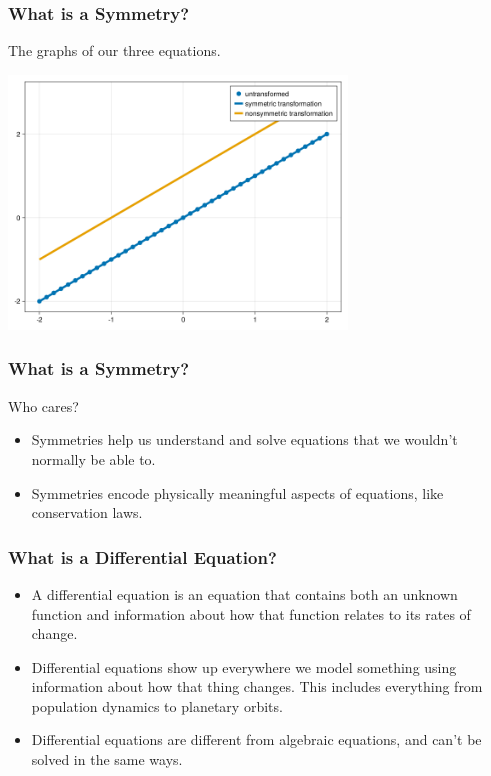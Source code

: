 \documentclass{beamer}
\begin{document}
\begin{frame}
    \frametitle{What is a Symmetry?}
    The graphs of our three equations.\\
    \begin{center}
        \includegraphics[width=9cm]{y=x+1.png}
    \end{center}
\end{frame}



\begin{frame}
    \frametitle{What is a Symmetry?}
    \begin{Large}
        Who cares?
    \end{Large}
    \vspace*{0.25in}
    \begin{itemize}
        \item Symmetries help us understand and solve equations that we wouldn't normally be able to.\pause
        \item Symmetries encode physically meaningful aspects of equations, like conservation laws.
    \end{itemize}
\end{frame}



\begin{frame}
    \frametitle{What is a Differential Equation?}
    \begin{definition}
    \begin{itemize}
        \item A differential equation is an equation that contains both an unknown function and information about how that function relates to its rates of change. \pause
        \item Differential equations show up everywhere we model something using information about how that thing changes. This includes everything from population dynamics to planetary orbits. \pause
        \item Differential equations are different from algebraic equations, and can't be solved in the same ways.
    \end{itemize}
\end{definition}
\end{frame}
\end{document}
